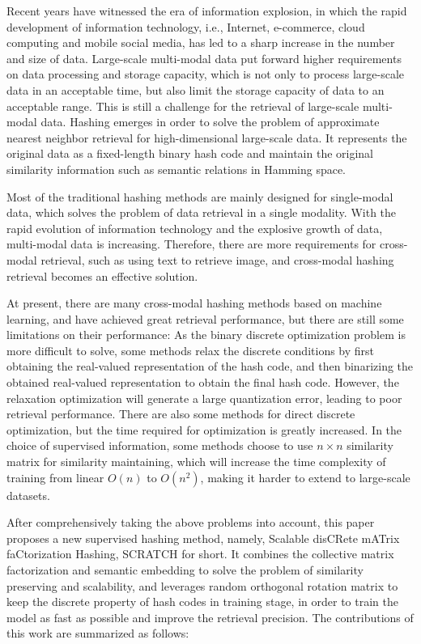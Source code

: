 \begin{englishabstract}

Recent years have witnessed the era of information explosion, in which the rapid development of information technology, i.e., Internet, e-commerce, cloud computing and mobile social media, has led to a sharp increase in the number and size of data. Large-scale multi-modal data put forward higher requirements on data processing and storage capacity, which is not only to process large-scale data in an acceptable time, but also limit the storage capacity of data to an acceptable range. This is still a challenge for the retrieval of large-scale multi-modal data. Hashing emerges in order to solve the problem of approximate nearest neighbor retrieval for high-dimensional large-scale data. It represents the original data  as a fixed-length binary hash code and maintain the original similarity information such as semantic relations in Hamming space.

Most of the traditional hashing methods are mainly designed for single-modal data, which solves the problem of data retrieval in a single modality. With the rapid evolution of information technology and the explosive growth of data, multi-modal data is increasing. Therefore, there are more requirements for cross-modal retrieval, such as using text to retrieve image, and cross-modal hashing retrieval becomes an effective solution.

At present, there are many cross-modal hashing methods based on machine learning, and have achieved great retrieval performance, but there are still some limitations on their performance: As the binary discrete optimization problem is more difficult to solve, some methods relax the discrete conditions by first obtaining the real-valued representation of the hash code, and then binarizing the obtained real-valued representation to obtain the final hash code. However, the relaxation optimization will generate a large quantization error, leading to poor retrieval performance. There are also some methods for direct discrete optimization, but the time required for optimization is greatly increased. In the choice of supervised information, some methods choose to use $n \times n$ similarity matrix for similarity maintaining, which will increase the time complexity of training from linear $O(n)$ to $O(n^2)$, making it harder to extend to large-scale datasets.

After comprehensively taking the above problems into account, this paper proposes a new supervised hashing method, namely, Scalable disCRete mATrix faCtorization Hashing, SCRATCH for short. It combines the collective matrix factorization and semantic embedding to solve the problem of similarity preserving and scalability, and leverages random orthogonal rotation matrix to keep the discrete property of hash codes in training stage, in order to train the model as fast as possible and improve the retrieval precision. The contributions of this work are summarized as follows:


\end{englishabstract}
